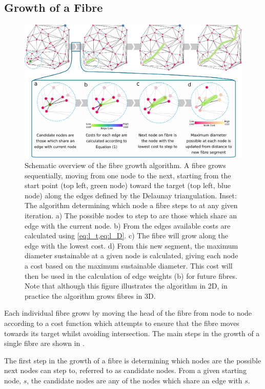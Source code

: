 \subsection{Growth of a Fibre}
\label{sec:growth_of_a_fibre}
\begin{figure}
	\centering
	\includegraphics[width = \textwidth]{figures/config/newMethod_v1.eps}
	\caption[Schematic overview of the fibre growth algorithm.]{\small Schematic overview of the fibre growth algorithm. A fibre grows sequentially, moving from one node to the next, starting from the start point (top left, green node) toward the target (top left, blue node) along the edges defined by the Delaunay triangulation. Inset: The algorithm determining which node a fibre steps to at any given iteration. a) The possible nodes to step to are those which share an edge with the current node. b) From the edges available costs are calculated using \cref{eq:l_t,eq:l_D}. c) The fibre will grow along the edge with the lowest cost. d) From this new segment, the maximum diameter sustainable at a given node is calculated, giving each node a cost based on the maximum sustainable diameter. This cost will then be used in the calculation of edge weights (b) for future fibres. Note that although this figure illustrates the algorithm in 2D, in practice the algorithm grows fibres in 3D.} 
	\label{fig:config_method}
\end{figure}
Each individual  fibre grows by moving the head of the fibre from node to node according to a cost function which attempts to ensure that the fibre moves towards its target whilst avoiding intersection.
The main steps in the growth of a single fibre are shown in . 

The first step in the growth of a fibre is determining which nodes are the possible next nodes can step to, referred to as candidate nodes.
From a given starting node, $s$, the candidate nodes are any of the nodes which share an edge with $s$.

